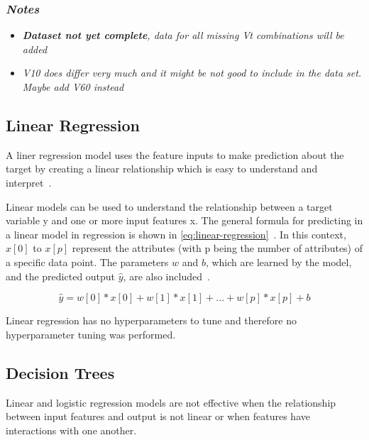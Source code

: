 \subsubsection*{\textit{Notes}}
\begin{itemize}
    \item \textit{\textbf{Dataset not yet complete}, data for all missing Vt combinations will be
    added}
    \item \textit{V10 does differ very much and it might be not good to include in the data set.
    Maybe add V60 instead}
\end{itemize}

\subsection{Linear Regression}\label{subsec:linear-regression}
A liner regression model uses the feature inputs to make prediction about the target by
creating a linear relationship which is easy to understand and interpret~\cite[p.
37]{molnar2020interpretable}.

Linear models can be used to understand the relationship between a target variable y and one or
more input features x.
The general formula for predicting in a linear model in regression is shown in
\ref{eq:linear-regression}~\cite[p. 45]{muller_introductionmachinelearning_2016}.
In this context, $x[0]$ to $x[p]$ represent the attributes (with p being the number of
attributes) of
a specific data point. The parameters $w$ and $b$, which are learned by the model, and the predicted
output $\hat{y}$, are also included~\cite[p. 45]{muller_introductionmachinelearning_2016}.

\begin{tcolorbox}[arc=0pt,boxrule=0.5pt]
    \begin{equation}
        \hat{y} = w[0] * x[0] + w[1] * x[1] + ... + w[p] * x[p] + b
    \end{equation}
    \label{eq:linear-regression}
\end{tcolorbox}

Linear regression has no hyperparameters to tune and therefore no hyperparameter tuning was
performed.

\subsection{Decision Trees}\label{subsec:decision-trees}
Linear and logistic regression models are not effective when the relationship between input
features and output is not linear or when features have interactions with one another.

